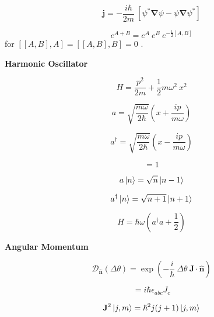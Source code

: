 \documentclass[11pt]{article}
\newcommand{\CurD}{\mathcal{D}}
\newcommand{\vect}[1]{\boldsymbol{\mathbf{#1}}}
\begin{document}
\begin{multicols}{2}
\begin{equation}
\vect{j} = - \frac{i \hbar}{2m} \: [\psi^* \vect{\nabla} \psi - \psi \vect{\nabla} \psi^*]
\end{equation}

\begin{equation}
e^{A+B}=e^A \: e^B \: e^{-\frac{1}{2}[A,B]} 
\end{equation}
{\footnotesize for \( [[A,B],A]=[[A,B],B]=0 \) .}

\columnbreak

{\bf Harmonic Oscillator}

\begin{equation}
H = \frac{p^2}{2m} + \frac{1}{2} m \omega^2 \: x^2
\end{equation}

\begin{equation}
a = \sqrt{\frac{m\omega}{2\hbar}} \left( x+\frac{ip}{m\omega} \right)
\end{equation}

\begin{equation}
a^{\dagger} = \sqrt{\frac{m\omega}{2\hbar}} \left( x-\frac{ip}{m\omega} \right)
\end{equation}

\begin{equation}
[\:a, a^{\dagger}] = 1
\end{equation}

\begin{equation}
a \ket{n} = \sqrt{n} \ket{n-1}
\end{equation}

\begin{equation}
a^{\dagger} \ket{n} = \sqrt{n+1} \ket{n+1}
\end{equation}

\begin{equation}
H = \hbar\omega(a^{\dagger}a+\frac{1}{2})
\end{equation}

{\bf Angular Momentum}

\begin{equation}
\CurD_{\vect{\hat{n}}} (\Delta \theta )  
  = \exp \left(-\frac{i}{\hbar} \: \Delta \theta \:
               \vect{J} \cdot \vect{\hat{n}} \right )
\end{equation}

\begin{equation}
[J_a,J_b] = i \hbar \epsilon_{abc} J_c
\end{equation}

\begin{equation}
\vect{J}^2 \ket{j,m} = \hbar^2 j (j+1) \ket{j,m}
\end{equation}


\end{multicols}
\end{document}
